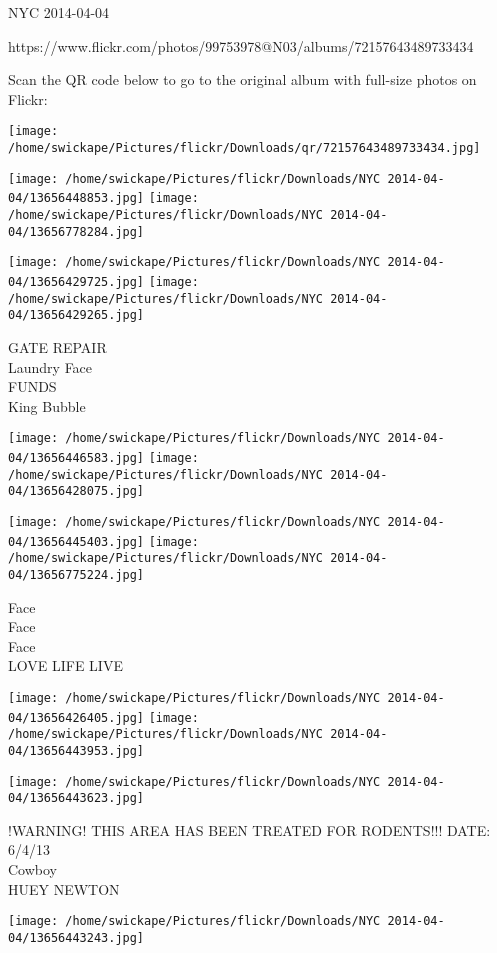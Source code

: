 \documentclass[10pt,letterpaper]{article}
\begin{document}
NYC 2014-04-04

https://www.flickr.com/photos/99753978@N03/albums/72157643489733434

Scan the QR code below to go to the original album with full-size photos on Flickr:

\texttt{[image: /home/swickape/Pictures/flickr/Downloads/qr/72157643489733434.jpg]}
\pagebreak

\texttt{[image: /home/swickape/Pictures/flickr/Downloads/NYC 2014-04-04/13656448853.jpg]}
\texttt{[image: /home/swickape/Pictures/flickr/Downloads/NYC 2014-04-04/13656778284.jpg]}

\texttt{[image: /home/swickape/Pictures/flickr/Downloads/NYC 2014-04-04/13656429725.jpg]}
\texttt{[image: /home/swickape/Pictures/flickr/Downloads/NYC 2014-04-04/13656429265.jpg]}

GATE REPAIR\\
Laundry Face\\
FUNDS\\
King Bubble
\pagebreak

\texttt{[image: /home/swickape/Pictures/flickr/Downloads/NYC 2014-04-04/13656446583.jpg]}
\texttt{[image: /home/swickape/Pictures/flickr/Downloads/NYC 2014-04-04/13656428075.jpg]}

\texttt{[image: /home/swickape/Pictures/flickr/Downloads/NYC 2014-04-04/13656445403.jpg]}
\texttt{[image: /home/swickape/Pictures/flickr/Downloads/NYC 2014-04-04/13656775224.jpg]}

Face\\
Face\\
Face\\
LOVE LIFE LIVE
\pagebreak

\texttt{[image: /home/swickape/Pictures/flickr/Downloads/NYC 2014-04-04/13656426405.jpg]}
\texttt{[image: /home/swickape/Pictures/flickr/Downloads/NYC 2014-04-04/13656443953.jpg]}

\vspace{0.25in}
\texttt{[image: /home/swickape/Pictures/flickr/Downloads/NYC 2014-04-04/13656443623.jpg]}

!WARNING! THIS AREA HAS BEEN TREATED FOR RODENTS!!! DATE: 6/4/13\\
Cowboy\\
HUEY NEWTON
\pagebreak

\texttt{[image: /home/swickape/Pictures/flickr/Downloads/NYC 2014-04-04/13656443243.jpg]}
\end{document}
